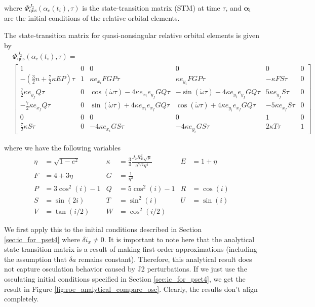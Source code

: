 where $\Phi^{J_2}_{\text{qns}}(\alpha_c(t_i), \tau)$ is the state-transition matrix (STM) at time $\tau$, and $\boldsymbol{\alpha_{i}}$ are the initial conditions of the relative orbital elements.

The state-transition matrix for quasi-nonsingular relative orbital elements is given by
\begin{align}
&\Phi^{J_2}_{\text{qns}}(\alpha_c(t_i), \tau) = \nonumber \\ 
&\begin{bmatrix}
1 & 0 & 0 & 0 & 0 & 0 \\
-\left( \frac{3}{2}n + \frac{7}{2} \kappa E P \right)\tau & 1 & \kappa e_{x_i} F G P \tau & \kappa e_{y_i} F G P \tau & -\kappa F S \tau & 0 \\
\frac{7}{2} \kappa e_{y_f} Q \tau & 0 & \cos(\dot{\omega} \tau) - 4\kappa e_{x_i} e_{y_f} G Q \tau & -\sin(\dot{\omega} \tau) - 4\kappa e_{y_i} e_{y_f} G Q \tau & 5\kappa e_{y_f} S \tau & 0 \\
-\frac{7}{2} \kappa e_{x_f} Q \tau & 0 & \sin(\dot{\omega} \tau) + 4\kappa e_{x_i} e_{x_f} G Q \tau & \cos(\dot{\omega} \tau) + 4\kappa e_{y_i} e_{x_f} G Q \tau & -5\kappa e_{x_f} S \tau & 0 \\
0 & 0 & 0 & 0 & 1 & 0 \\
\frac{7}{2} \kappa S \tau & 0 & -4 \kappa e_{x_i} G S \tau & -4 \kappa e_{y_i} G S \tau & 2 \kappa T \tau & 1
\end{bmatrix}
\end{align}

where we have the following variables
\begin{align*}
\eta &= \sqrt{1 - e^2} &
\kappa &= \frac{3}{4} \frac{J_2 R_E^2 \sqrt{\mu}}{a^{7/2} \eta^4} &
E &= 1 + \eta \\
F &= 4 + 3\eta &
G &= \frac{1}{\eta^2} & \\
P &= 3\cos^2(i) - 1 &
Q &= 5\cos^2(i) - 1 &
R &= \cos(i) \\
S &= \sin(2i) &
T &= \sin^2(i) &
U &= \sin(i) \\
V &= \tan(i/2) &
W &= \cos^2(i/2)
\end{align*}

We first apply this to the initial conditions described in Section \ref{sec:ic_for_pset4} where $\delta i_x \neq 0$.
It is important to note here that the analytical state transition matrix is a result of making first-order approximations (including the assumption that $\delta a$ remains constant). Therefore, this analytical result does not capture osculation behavior caused by J2 perturbations. If we just use the osculating initial conditions specified in Section \ref{sec:ic_for_pset4}, we get the result in Figure \ref{fig:roe_analytical_compare_osc}. Clearly, the results don't align completely.

